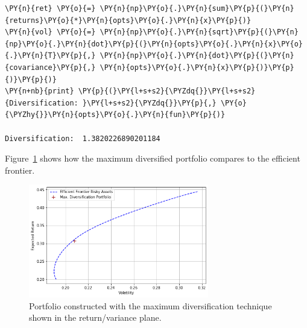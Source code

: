 \begin{tcolorbox}[breakable, size=fbox, boxrule=1pt, pad at break*=1mm,colback=cellbackground, colframe=cellborder]
\begin{Verbatim}[commandchars=\\\{\}]
\PY{n}{ret} \PY{o}{=} \PY{n}{np}\PY{o}{.}\PY{n}{sum}\PY{p}{(}\PY{n}{returns}\PY{o}{*}\PY{n}{opts}\PY{o}{.}\PY{n}{x}\PY{p}{)}
\PY{n}{vol} \PY{o}{=} \PY{n}{np}\PY{o}{.}\PY{n}{sqrt}\PY{p}{(}\PY{n}{np}\PY{o}{.}\PY{n}{dot}\PY{p}{(}\PY{n}{opts}\PY{o}{.}\PY{n}{x}\PY{o}{.}\PY{n}{T}\PY{p}{,} \PY{n}{np}\PY{o}{.}\PY{n}{dot}\PY{p}{(}\PY{n}{covariance}\PY{p}{,} \PY{n}{opts}\PY{o}{.}\PY{n}{x}\PY{p}{)}\PY{p}{)}\PY{p}{)} 
\PY{n+nb}{print} \PY{p}{(}\PY{l+s+s2}{\PYZdq{}}\PY{l+s+s2}{Diversification: }\PY{l+s+s2}{\PYZdq{}}\PY{p}{,} \PY{o}{\PYZhy{}}\PY{n}{opts}\PY{o}{.}\PY{n}{fun}\PY{p}{)}

Diversification:  1.3820226890201184
\end{Verbatim}
\end{tcolorbox}
Figure~\ref{fig:max_div} shows how the maximum diversified portfolio compares to the efficient frontier.

\begin{figure}[htb]
	\centering
	\includegraphics[width=0.7\textwidth]{figures/max_div.png}
	\caption{Portfolio constructed with the maximum diversification technique shown in the return/variance plane.}
	\label{fig:max_div}
\end{figure}
